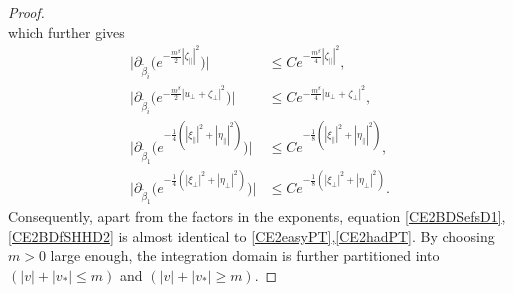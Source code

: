 \documentclass[reqno]{amsart}
\numberwithin{equation}{section}
\numberwithin{equation}{section}
\begin{document}
\begin{proof}
\begin{equation*}
		\end{equation*}
		which further gives
		\begin{align*}
			\big|\partial_{\tilde{\beta}_i}\big(e^{-\frac{m^\beta}{2}|\zeta_{\parallel}|^2}\big)\big|&\leq C e^{-\frac{m^\beta}{4}|\zeta_{\parallel}|^2},\\
			\big|\partial_{\tilde{\beta}_i}\big(e^{-\frac{m^\beta}{2}|u_{\perp} + \zeta_{\perp}|^2}\big)\big|&\leq C e^{-\frac{m^\beta}{4}|u_{\perp} + \zeta_{\perp}|^2},\\
			\big|\partial_{\tilde{\beta}_1}\big(e^{-\frac{1}{4}(|\xi_{\parallel}|^2+|\eta_{\parallel}|^2)}\big)\big|&\leq C e^{-\frac{1}{8}(|\xi_{\parallel}|^2+|\eta_{\parallel}|^2)},\\
			\big|\partial_{\tilde{\beta}_1}\big(e^{-\frac{1}{4}(|\xi_{\perp}|^2+|\eta_{\perp}|^2) }\big)\big|&\leq C e^{-\frac{1}{8}(|\xi_{\perp}|^2+|\eta_{\perp}|^2) }.
		\end{align*}
		Consequently, apart from the factors in the exponents, equation \eqref{CE2BDSefsD1},\eqref{CE2BDfSHHD2} is almost identical to \eqref{CE2easyPT},\eqref{CE2hadPT}. By choosing $m>0$ large enough, the integration domain is further partitioned into $(|v|+|v_*| \leq m)$ and $(|v|+|v_*| \geq m)$. 
		

\end{proof}
\end{document}
